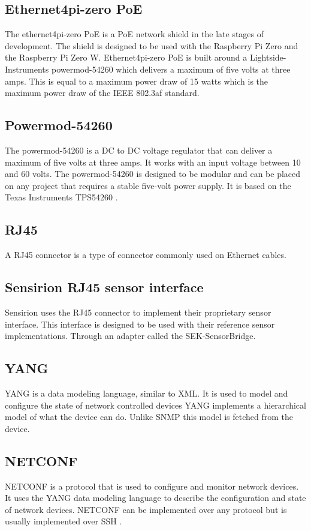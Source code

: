 \documentclass[12pt]{article}
\begin{document}
\subsection{Ethernet4pi-zero PoE}
The ethernet4pi-zero PoE is a PoE network shield in the late stages of development.
The shield is designed to be used with the Raspberry Pi Zero and the Raspberry Pi Zero W.
Ethernet4pi-zero PoE is built around a Lightside-Instruments powermod-54260 which delivers a maximum of five volts at three amps.
This is equal to a maximum power draw of 15 watts which is the maximum power draw of the IEEE 802.3af standard.

\subsection{Powermod-54260}
The powermod-54260 is a DC to DC voltage regulator that can deliver a maximum of five volts at three amps.
It works with an input voltage between 10 and 60 volts. The powermod-54260 is designed to be modular and
can be placed on any project that requires a stable five-volt power supply. It is based on the Texas Instruments TPS54260 \cite{TPS54260DataSheet}.


\subsection{RJ45}
A RJ45 connector is a type of connector commonly used on Ethernet cables.

\subsection{Sensirion RJ45 sensor interface}
Sensirion uses the RJ45 connector to implement their proprietary sensor interface.
This interface is designed to be used with their reference sensor implementations. Through 
an adapter called the SEK-SensorBridge.

\subsection{YANG}
YANG is a data modeling language, similar to XML. It is used to model and configure the state of network controlled devices \cite{bjorklundYANG11Data2016}
YANG implements a hierarchical model of what the device can do. Unlike SNMP this model is fetched from the device.

\subsection{NETCONF}
NETCONF is a protocol that is used to configure and monitor network devices. It uses the YANG data modeling language to describe the configuration and state of network devices.
NETCONF can be implemented over any protocol but is usually implemented over SSH \cite{ennsNetworkConfigurationProtocol2011}.
\end{document}
